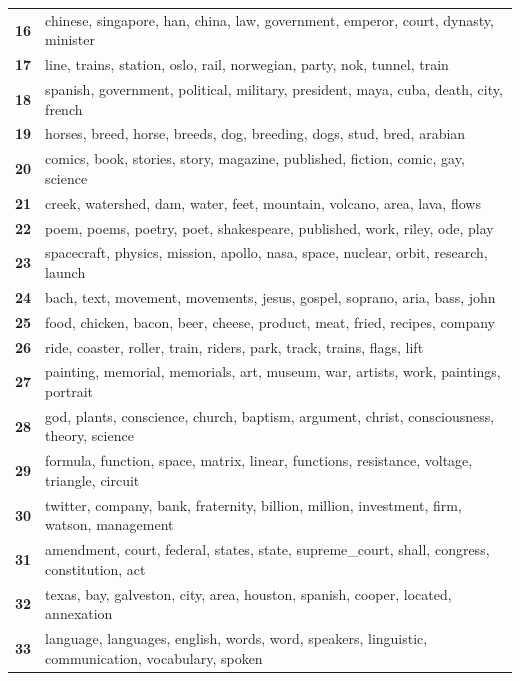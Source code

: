 \begin{table}[htpb]
\begin{tabularx}{\textwidth}{@{}l X@{}}
        \textbf{16} & chinese, singapore, han, china, law, government, emperor, court, dynasty, minister \\
        \textbf{17} & line, trains, station, oslo, rail, norwegian, party, nok, tunnel, train \\
        \textbf{18} & spanish, government, political, military, president, maya, cuba, death, city, french \\
        \textbf{19} & horses, breed, horse, breeds, dog, breeding, dogs, stud, bred, arabian \\
        \textbf{20} & comics, book, stories, story, magazine, published, fiction, comic, gay, science \\
        \textbf{21} & creek, watershed, dam, water, feet, mountain, volcano, area, lava, flows \\
        \textbf{22} & poem, poems, poetry, poet, shakespeare, published, work, riley, ode, play \\
        \textbf{23} & spacecraft, physics, mission, apollo, nasa, space, nuclear, orbit, research, launch \\
        \textbf{24} & bach, text, movement, movements, jesus, gospel, soprano, aria, bass, john \\
        \textbf{25} & food, chicken, bacon, beer, cheese, product, meat, fried, recipes, company \\
        \textbf{26} & ride, coaster, roller, train, riders, park, track, trains, flags, lift \\
        \textbf{27} & painting, memorial, memorials, art, museum, war, artists, work, paintings, portrait \\
        \textbf{28} & god, plants, conscience, church, baptism, argument, christ, consciousness, theory, science \\
        \textbf{29} & formula, function, space, matrix, linear, functions, resistance, voltage, triangle, circuit \\
        \textbf{30} & twitter, company, bank, fraternity, billion, million, investment, firm, watson, management \\
        \textbf{31} & amendment, court, federal, states, state, supreme\_court, shall, congress, constitution, act \\
        \textbf{32} & texas, bay, galveston, city, area, houston, spanish, cooper, located, annexation \\
        \textbf{33} & language, languages, english, words, word, speakers, linguistic, communication, vocabulary, spoken \\

\end{tabularx}
\end{table}
